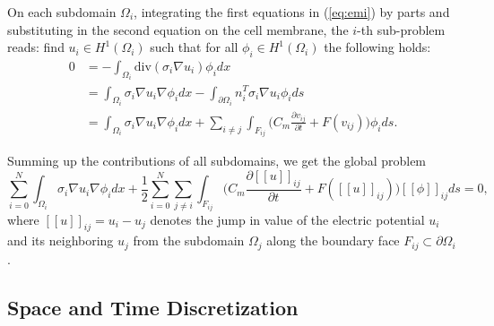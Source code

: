 On each subdomain $\Omega_i$, integrating the first equations in (\ref{eq:emi}) by parts and substituting in the second equation on the cell membrane, the $i$-th sub-problem reads: find $u_i \in H^1(\Omega_i)$ such that for all $\phi_i \in H^1(\Omega_i)$ the following holds:
\begin{equation*}
    \begin{split}
        0 & = -\int_{\Omega_i}\text{div}(\sigma_i\nabla u_i) \phi_idx \\
        & = \int_{\Omega_i}\sigma_i\nabla u_i \nabla\phi_idx - \int_{\partial \Omega_i} n_i^T\sigma_i\nabla u_i \phi_ids \\
        & = \int_{\Omega_i}\sigma_i\nabla u_i \nabla\phi_idx + \sum_{i \neq j}\int_{F_{ij}} \big(C_m\frac{\partial v_{ij}}{\partial t} + F(v_{ij})\big)\phi_ids.
    \end{split}
\end{equation*} 

Summing up the contributions of all subdomains, we get the global problem
\[\sum_{i = 0}^N\int_{\Omega_i}\sigma_i\nabla u_i\nabla\phi_idx + \frac{1}{2} \sum_{i = 0}^N\sum_{j \neq i}\int_{F_{ij}}\big(C_m\frac{\partial[\![u]\!]_{ij}}{\partial t} + F([\![u]\!]_{ij})\big)[\![\phi]\!]_{ij}ds = 0,\]
where $[\![u]\!]_{ij} = u_i - u_j$ denotes the jump in value of the electric potential $u_i$ and its neighboring $u_j$ from the subdomain $\Omega_j$ along the boundary face $F_{ij}\subset \partial\Omega_i$.

\subsection{Space and Time Discretization}

